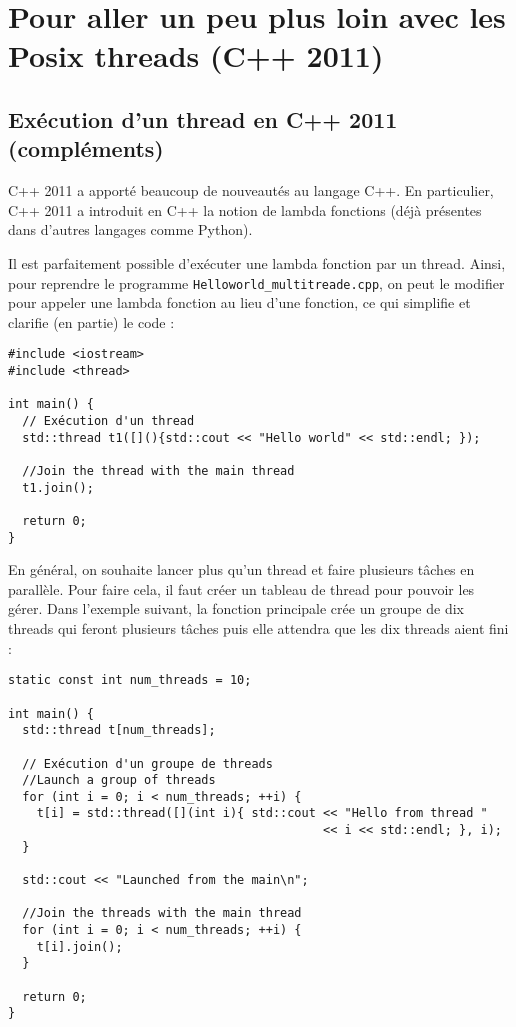 \documentclass[fleqn,11pt]{article}
\begin{document}
\section{Pour aller un peu plus loin avec les Posix threads (C++ 2011)}

\subsection{Exécution d'un thread en C++ 2011 (compléments)}

C++ 2011 a apporté beaucoup de nouveautés au langage C++. En particulier, C++ 2011 a introduit
en C++ la notion de lambda fonctions (déjà présentes dans d'autres langages comme Python).

Il est parfaitement possible d'exécuter une lambda fonction par un thread. Ainsi,
pour reprendre le programme \texttt{Helloworld\_multitreade.cpp}, on peut le modifier
pour appeler une lambda fonction au lieu d'une fonction, ce qui simplifie et clarifie
(en partie) le code :

\begin{lstlisting}
#include <iostream>
#include <thread>

int main() {
  // Exécution d'un thread
  std::thread t1([](){std::cout << "Hello world" << std::endl; });

  //Join the thread with the main thread
  t1.join();

  return 0;
}
\end{lstlisting}

En général, on souhaite lancer plus qu'un thread et faire plusieurs tâches en parallèle. Pour faire cela,
il faut créer un tableau de thread pour pouvoir les gérer. 
Dans l'exemple suivant, la fonction principale crée un groupe de dix threads  qui feront plusieurs tâches puis elle attendra que les dix threads aient fini :

\begin{lstlisting}
static const int num_threads = 10;

int main() {
  std::thread t[num_threads];

  // Exécution d'un groupe de threads
  //Launch a group of threads
  for (int i = 0; i < num_threads; ++i) {
    t[i] = std::thread([](int i){ std::cout << "Hello from thread " 
                                            << i << std::endl; }, i);
  }

  std::cout << "Launched from the main\n";

  //Join the threads with the main thread
  for (int i = 0; i < num_threads; ++i) {
    t[i].join();
  }

  return 0;
}
\end{lstlisting}
\end{document}
